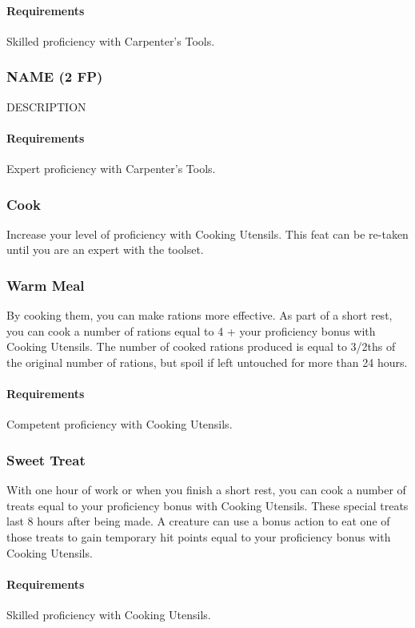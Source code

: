     \paragraph{Requirements} Skilled proficiency with Carpenter's Tools.
\subsubsection{NAME (2 FP)} \label{feat::name}
    DESCRIPTION
    \paragraph{Requirements} Expert proficiency with Carpenter's Tools.
\subsubsection{Cook} \label{feat::cook}
    Increase your level of proficiency with Cooking Utensils.
    This feat can be re-taken until you are an expert with the toolset.
\subsubsection{Warm Meal} \label{feat::warmmeal}
    By cooking them, you can make rations more effective.
    As part of a short rest, you can cook a number of rations equal to 4 + your proficiency bonus with Cooking Utensils.
    The number of cooked rations produced is equal to 3/2ths of the original number of rations, but spoil if left untouched for more than 24 hours.
    \paragraph{Requirements} Competent proficiency with Cooking Utensils.
\subsubsection{Sweet Treat} \label{feat::sweettreat}
    With one hour of work or when you finish a short rest, you can cook a number of treats equal to your proficiency bonus with Cooking Utensils.
    These special treats last 8 hours after being made.
    A creature can use a bonus action to eat one of those treats to gain temporary hit points equal to your proficiency bonus with Cooking Utensils.
    \paragraph{Requirements} Skilled proficiency with Cooking Utensils.
